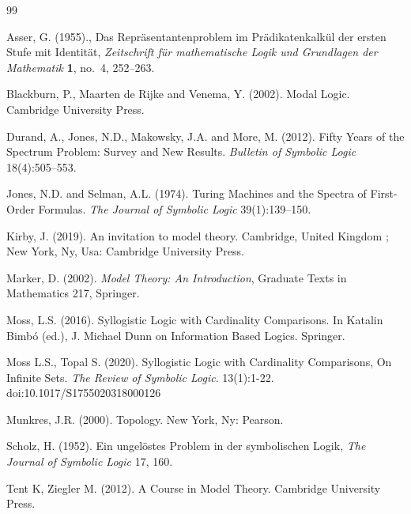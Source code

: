 \documentclass[12pt, reqno]{amsart}
\theoremstyle{definition}
\theoremstyle{remark}
\numberwithin{equation}{section}
\begin{document}

\begin{thebibliography}{99}

Asser, G. (1955).,
Das Repr\"asentantenproblem im Pr\"adikatenkalk\"ul der ersten Stufe mit Identit\"at,
\textit{Zeitschrift f\"ur mathematische Logik und Grundlagen der Mathematik}
\textbf{1}, no.~4, 252--263.

 Blackburn, P., Maarten de Rijke and Venema, Y. (2002). Modal Logic. Cambridge University Press.

Durand, A., Jones, N.D., Makowsky, J.A. and More, M. (2012). Fifty Years of the Spectrum Problem: Survey and New Results. \textit{Bulletin of Symbolic Logic} 18(4):505--553.

Jones, N.D. and Selman, A.L. (1974). Turing Machines and the Spectra of First-Order Formulas. \textit{The Journal of Symbolic Logic} 39(1):139--150.


 Kirby, J. (2019). An invitation to model theory. Cambridge, United Kingdom ; New York, Ny, Usa: Cambridge University Press.

Marker, D. (2002).
\textit{Model Theory: An Introduction},
Graduate Texts in Mathematics 217,
Springer.

 Moss, L.S. (2016). Syllogistic Logic with Cardinality Comparisons. In Katalin Bimbó (ed.), J. Michael Dunn on Information Based Logics. Springer.

 Moss L.S., Topal S. (2020). Syllogistic Logic with Cardinality Comparisons, On Infinite Sets. \textit{The Review of Symbolic Logic}. 13(1):1-22. doi:10.1017/S1755020318000126 

 Munkres, J.R. (2000). Topology. New York, Ny: Pearson.

Scholz, H. (1952).
Ein ungel\"ostes Problem in der symbolischen Logik,
\textit{The Journal of Symbolic Logic}
17, 160.

Tent K, Ziegler M. (2012). A Course in Model Theory. Cambridge University Press.

\end{thebibliography}
\end{document}
